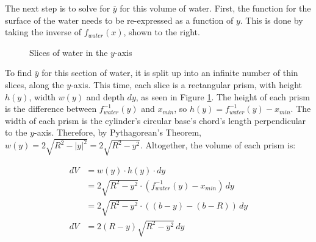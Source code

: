 \documentclass[11pt]{article}
\begin{document}
    The next step is to solve for $\overline{y}$ for this volume of water. First, the function for the surface of the water needs to be re-expressed as a function of $y$. This is done by taking the inverse of $f_{water}(x)$, shown to the right.

    \begin{figure}
        \centering
        \vspace{-10pt}
        \caption{Slices of water in the $y$-axis}
        \label{fig:water-prisms-y}
    \end{figure}

    To find $\overline{y}$ for this section of water, it is split up into an infinite number of thin slices, along the $y$-axis. This time, each slice is a rectangular prism, with height $h(y)$, width $w(y)$ and depth $dy$, as seen in Figure \ref{fig:water-prisms-y}. The height of each prism is the difference between $f^{-1}_{water}(y)$ and $x_{min}$, so ${h(y) = f^{-1}_{water}(y) - x_{min}}$. The width of each prism is the cylinder's circular base's chord's length perpendicular to the $y$-axis. Therefore, by Pythagorean's Theorem, ${w(y) = 2\sqrt{R^2 - |y|^2} = 2\sqrt{R^2 - y^2}}$. Altogether, the volume of each prism is:

    \vspace{-30pt}
    {\footnotesize\begin{align*}
        dV &= w(y) \cdot h(y) \cdot dy \\
        &= 2 \sqrt{R^2 - y^2} \cdot (f^{-1}_{water}(y) - x_{min}) \, dy \\
        &= 2 \sqrt{R^2 - y^2} \cdot \left( (b - y) - (b - R) \right) \, dy \\
        dV &= 2 (R - y) \sqrt{R^2 - y^2} \, dy
    \end{align*}}
\end{document}
